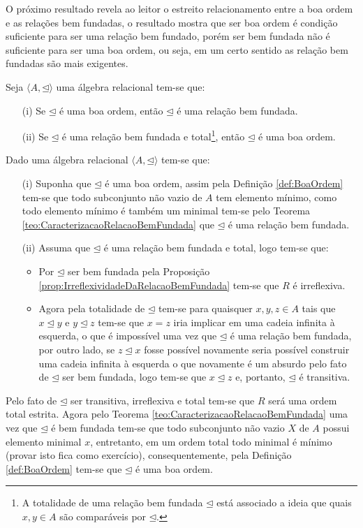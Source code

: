 O próximo resultado revela ao leitor o estreito relacionamento entre a boa ordem e as relações bem fundadas, o resultado mostra que ser boa ordem é condição suficiente para ser uma relação bem fundado, porém ser bem fundada não é suficiente para ser uma boa ordem, ou seja, em um certo sentido as relação bem fundadas são mais exigentes.

\begin{teorema}\label{teo:RelacoesBemFundada-BoaOrdem}
	Seja $\langle A, \unlhd \rangle$ uma álgebra relacional tem-se que:
	\begin{itemize}
		\item[(i)] Se $\unlhd$ é uma boa ordem, então $\unlhd$ é uma relação bem fundada.
		\item[(ii)] Se $\unlhd$ é uma relação bem fundada e total\footnote{A totalidade de uma relação bem fundada $\unlhd$ está associado a ideia que quais $x, y \in A$ são comparáveis por $\unlhd$.}, então $\unlhd$ é uma boa ordem.
	\end{itemize}
\end{teorema}

\begin{prova}
	Dado uma álgebra relacional $\langle A, \unlhd \rangle$ tem-se que:
	\begin{itemize}
		\item[(i)] Suponha que $\unlhd$ é uma boa ordem, assim pela Definição \ref{def:BoaOrdem} tem-se que todo subconjunto não vazio de $A$ tem elemento mínimo, como todo elemento mínimo é também um minimal tem-se pelo Teorema \ref{teo:CaracterizacaoRelacaoBemFundada} que $\unlhd$ é uma relação bem fundada.
		\item[(ii)] Assuma que $\unlhd$ é uma relação bem fundada e total, logo tem-se que:
		\begin{itemize}
			\item Por $\unlhd$ ser bem fundada pela Proposição \ref{prop:IrreflexividadeDaRelacaoBemFundada} tem-se que $R$ é irreflexiva.
			\item Agora pela totalidade de $\unlhd$ tem-se para quaisquer $x, y, z \in A$ tais que $x \unlhd y$ e $y \unlhd z$ tem-se que $x = z$ iria implicar em uma cadeia infinita à esquerda, o que é impossível uma vez que $\unlhd$ é uma relação bem fundada, por outro lado, se $z \unlhd x$ fosse possível novamente seria possível construir uma cadeia infinita à esquerda o que novamente é um absurdo pelo fato de $\unlhd$ ser bem fundada, logo tem-se que $x \unlhd z$ e, portanto, $\unlhd$ é transitiva.
		\end{itemize}
	\end{itemize}
	Pelo fato de $\unlhd$ ser transitiva, irreflexiva e total tem-se que $R$ será uma ordem total estrita. Agora pelo Teorema \ref{teo:CaracterizacaoRelacaoBemFundada} uma vez que $\unlhd$ é bem fundada tem-se que todo subconjunto não vazio $X$ de $A$ possui elemento minimal $x$, entretanto, em um ordem total todo minimal é mínimo (provar isto fica como exercício), consequentemente, pela Definição \ref{def:BoaOrdem} tem-se que $\unlhd$ é uma boa ordem.
\end{prova}

